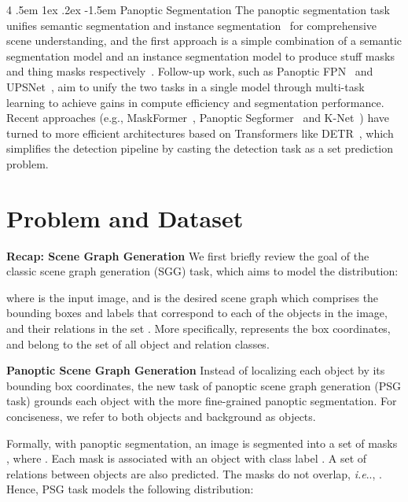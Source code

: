 \documentclass[runningheads]{llncs}
\makeatletter
\newcommand{\keypoint}[1]{\noindent\textbf{#1}\quad}
\renewcommand\paragraph{
  \@startsection{paragraph} {4} {\z@} {.5em \@plus1ex \@minus.2ex} {-1.5em} {\normalfont\normalsize\bfseries} }
\DeclareRobustCommand\onedot{\futurelet\@let@token\@onedot}
\def\@onedot{\ifx\@let@token.\else.\null\fi\xspace}
\def\ie{\emph{i.e}\onedot} \def\Ie{\emph{I.e}\onedot}
\makeatother
\begin{document}
\paragraph{Panoptic Segmentation}
The panoptic segmentation task unifies semantic segmentation and instance segmentation~\cite{panopticsegmentation} for comprehensive scene understanding, and the first approach is a simple combination of a semantic segmentation model and an instance segmentation model to produce stuff masks and thing masks respectively~\cite{panopticsegmentation}. Follow-up work, such as Panoptic FPN~\cite{kirillov2019panoptic} and UPSNet~\cite{Xiong2019UPSNetAU}, aim to unify the two tasks in a single model through multi-task learning to achieve gains in compute efficiency and segmentation performance. Recent approaches (e.g., MaskFormer~\cite{Cheng2021MaskFormer}, Panoptic Segformer~\cite{Li2021PanopticS} and K-Net~\cite{zhang2021knet}) have turned to more efficient architectures based on Transformers like DETR~\cite{detr}, which simplifies the detection pipeline by casting the detection task as a set prediction problem.
 \section{Problem and Dataset}
\label{sec:problem_dataset}

\keypoint{Recap: Scene Graph Generation}
We first briefly review the goal of the classic scene graph generation (SGG) task, which aims to model the distribution:

where  is the input image, and  is the desired scene graph which comprises the bounding boxes  and labels  that correspond to each of the  objects in the image, and their relations in the set . 
More specifically,  represents the box coordinates,  
and  
belong to the set of all object and relation classes.

\medskip

\keypoint{Panoptic Scene Graph Generation} Instead of localizing each object by its bounding box coordinates, the new task of panoptic scene graph generation (PSG task) grounds each object with the more fine-grained panoptic segmentation. For conciseness, we refer to both objects and background as objects.

Formally, with panoptic segmentation, an image is segmented into a set of masks , where . Each mask is associated with an object with class label . A set of relations  between objects are also predicted. The masks do not overlap, \ie, . Hence, PSG task models the following distribution:
\end{document}
